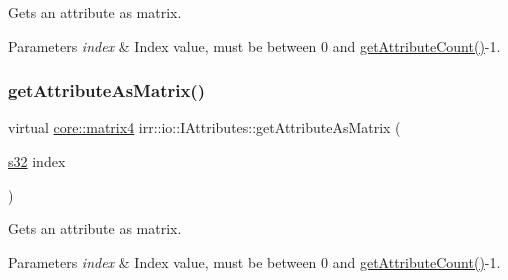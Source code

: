Gets an attribute as matrix. 


\begin{DoxyParams}{Parameters}
{\em index} & Index value, must be between 0 and \hyperlink{classirr_1_1io_1_1IAttributes_a796bdd9440ee7ba0b6742a90a82870b6}{get\+Attribute\+Count()}-\/1. \\
\hline
\end{DoxyParams}
\mbox{\label{classirr_1_1io_1_1IAttributes_aaceb2fc0fca684d941918ce18d876336}} 
\subsubsection{\texorpdfstring{get\+Attribute\+As\+Matrix()}{getAttributeAsMatrix()}\hspace{0.1cm}{\footnotesize\ttfamily [4/4]}}
{\footnotesize\ttfamily virtual \hyperlink{namespaceirr_1_1core_a4c9d4e29899535971052810954a14431}{core\+::matrix4} irr\+::io\+::\+I\+Attributes\+::get\+Attribute\+As\+Matrix (\begin{DoxyParamCaption}\item[{\hyperlink{namespaceirr_ac66849b7a6ed16e30ebede579f9b47c6}{s32}}]{index }\end{DoxyParamCaption})\hspace{0.3cm}{\ttfamily [pure virtual]}}



Gets an attribute as matrix. 


\begin{DoxyParams}{Parameters}
{\em index} & Index value, must be between 0 and \hyperlink{classirr_1_1io_1_1IAttributes_a796bdd9440ee7ba0b6742a90a82870b6}{get\+Attribute\+Count()}-\/1. \\
\hline
\end{DoxyParams}
\mbox{\label{classirr_1_1io_1_1IAttributes_a1d660e66f832cd670a47f5898bc0f5df}} 

